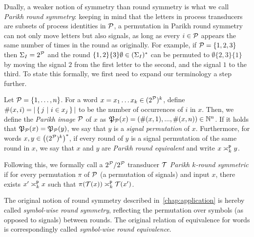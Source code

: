 Dually, a weaker notion of symmetry than round symmetry is what we call \emph{Parikh round symmetry}: keeping in mind that the letters in process transducers are subsets of process identities in $\cP$, a permutation in Parikh round symmetry can not only move letters but also signals, as long as every $i\in \cP$ appears the same number of times in the round as originally. For example, if $\cP=\{1,2,3\}$ then $\sI=2^\cP$ and the round $\{1,2\}\{3\}\emptyset\in(\sI)^*$ can be permuted to $\emptyset\{2,3\}\{1\}$ by moving the signal $2$ from the first letter to the second, and the signal $1$ to the third. To state this formally, we first need to expand our terminology a step further.

Let $\cP=\{1,\dots,n\}$. For a word $x=x_1\dots x_k \in (2^\cP)^k$, define $\#(x,i) = |\condset{j}{i \in x_j}|$ to be the number of occurrences of $i$ in $x$. Then, we define the \emph{Parikh image \WRT $\cP$} of $x$ as $\fP_\cP(x) = (\#(x,1),...,\#(x,n))\in \bbN^n$. If it holds that $\fP_\cP(x)=\fP_\cP(y)$, we say that $y$ is a \emph{signal permutation} of $x$. Furthermore, for words $x,y\in\left((2^\cP)^k\right)^*$, if every round of $y$ is a signal permutation of the same round in $x$, we say that $x$ and $y$ are \emph{Parikh round equivalent} and write $x\reqtype[k]{p} y$.

Following this, we formally call a $2^\cP/2^\cP$ transducer $\cT$ \emph{Parikh $k$-round symmetric} if for every permutation $\pi$ of $\cP$ (a permutation of signals) and input $x$, there exists $x'\reqtype[k]{p} x$ such that $\pi(\cT(x))\reqtype[k]{p} \cT(x')$.

The original notion of round symmetry described in~\cref{chap:application} is hereby called \emph{symbol-wise round symmetry}, reflecting the permutation over symbols (as opposed to signals) between rounds. The original relation of equivalence for words is correspondingly called \emph{symbol-wise round equivalence}.

